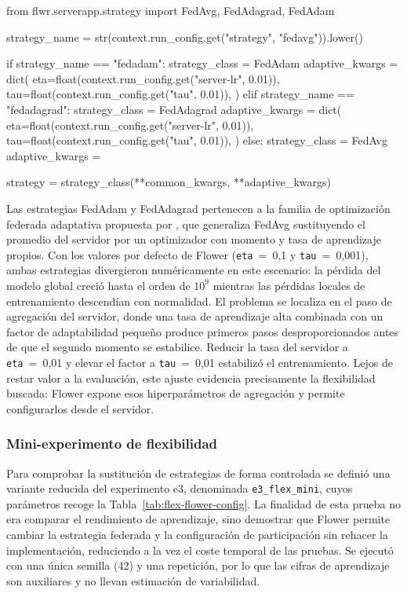 \begin{pythoncode}[title={server\_app.py}, label={cod:flower-strategy}, list entry={\protect\numberline{\thelisting}Selección dinámica de la estrategia en Flower (server\_app.py)}]
from flwr.serverapp.strategy import FedAvg, FedAdagrad, FedAdam

strategy_name = str(context.run_config.get("strategy", "fedavg")).lower()

if strategy_name == "fedadam":
    strategy_class = FedAdam
    adaptive_kwargs = dict(
        eta=float(context.run_config.get("server-lr", 0.01)),
        tau=float(context.run_config.get("tau", 0.01)),
    )
elif strategy_name == "fedadagrad":
    strategy_class = FedAdagrad
    adaptive_kwargs = dict(
        eta=float(context.run_config.get("server-lr", 0.01)),
        tau=float(context.run_config.get("tau", 0.01)),
    )
else:
    strategy_class = FedAvg
    adaptive_kwargs = {}

strategy = strategy_class(**common_kwargs, **adaptive_kwargs)
\end{pythoncode}

Las estrategias FedAdam y FedAdagrad pertenecen a la familia de optimización
federada adaptativa propuesta por \textcite{reddi2021adaptive}, que generaliza
FedAvg sustituyendo el promedio del servidor por un optimizador con momento y tasa
de aprendizaje propios. Con los valores por defecto de Flower
(\texttt{eta}~=~0,1 y \texttt{tau}~=~0,001), ambas estrategias divergieron
numéricamente en este escenario: la pérdida del modelo global creció hasta el
orden de $10^{9}$ mientras las pérdidas locales de entrenamiento descendían con
normalidad. El problema se localiza en el paso de agregación del servidor, donde
una tasa de aprendizaje alta combinada con un factor de adaptabilidad pequeño
produce primeros pasos desproporcionados antes de que el segundo momento se
estabilice. Reducir la tasa del servidor a \texttt{eta}~=~0,01 y elevar el factor
a \texttt{tau}~=~0,01 estabilizó el entrenamiento. Lejos de restar valor a la
evaluación, este ajuste evidencia precisamente la flexibilidad buscada: Flower
expone esos hiperparámetros de agregación y permite configurarlos desde el
servidor.

\subsubsection{Mini-experimento de flexibilidad}\label{subsec:flex-flower-mini}

Para comprobar la sustitución de estrategias de forma controlada se definió una
variante reducida del experimento e3, denominada \texttt{e3\_\allowbreak flex\_\allowbreak mini}, cuyos
parámetros recoge la Tabla~\ref{tab:flex-flower-config}. La finalidad de esta
prueba no era comparar el rendimiento de aprendizaje, sino demostrar que Flower
permite cambiar la estrategia federada y la configuración de participación sin
rehacer la implementación, reduciendo a la vez el coste temporal de las pruebas.
Se ejecutó con una única semilla (42) y una repetición, por lo que las cifras de
aprendizaje son auxiliares y no llevan estimación de variabilidad.

